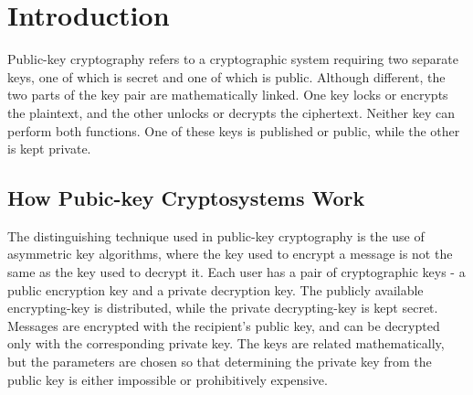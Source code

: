 \documentclass[12pt]{article} %
\begin{document}
\maketitle
\setcounter{secnumdepth}{1}

\section{Introduction}
Public-key cryptography refers to a cryptographic system requiring two separate keys, one of which is secret and one of which is public. Although different, the two parts of the key pair are mathematically linked. One key locks or encrypts the plaintext, and the other unlocks or decrypts the ciphertext. Neither key can perform both functions. One of these keys is published or public, while the other is kept private.
\subsection{How Pubic-key Cryptosystems Work}
The distinguishing technique used in public-key cryptography is the use of asymmetric key algorithms, where the key used to encrypt a message is not the same as the key used to decrypt it. Each user has a pair of cryptographic keys - a public encryption key and a private decryption key. The publicly available encrypting-key is distributed, while the private decrypting-key is kept secret. Messages are encrypted with the recipient's public key, and can be decrypted only with the corresponding private key. The keys are related mathematically, but the parameters are chosen so that determining the private key from the public key is either impossible or prohibitively expensive. 
\end{document}
